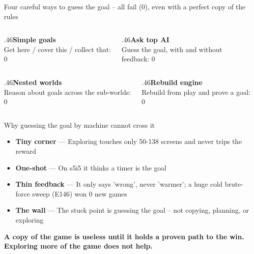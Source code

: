 \documentclass[aspectratio=169,11pt]{beamer}
\begin{document}
\begin{frame}{Four careful ways to guess the goal -- all fail (0), even with a perfect copy of the rules}\vfill\begin{columns}[T]\begin{column}{.46\textwidth}{\color{owdeep}\bfseries Simple goals}\\[2pt]{\color{owmuted}\small Get here / cover this / collect that: 0}\end{column}\begin{column}{.46\textwidth}{\color{owdeep}\bfseries Ask top AI}\\[2pt]{\color{owmuted}\small Guess the goal, with and without feedback: 0}\end{column}\end{columns}\vskip12pt\begin{columns}[T]\begin{column}{.46\textwidth}{\color{owdeep}\bfseries Nested worlds}\\[2pt]{\color{owmuted}\small Reason about goals across the sub-worlds: 0}\end{column}\begin{column}{.46\textwidth}{\color{owdeep}\bfseries Rebuild engine}\\[2pt]{\color{owmuted}\small Rebuild from play and prove a goal: 0}\end{column}\end{columns}\vfill\end{frame}
\begin{frame}{Why guessing the goal by machine cannot cross it}\vfill\begin{itemize}\item \textbf{Tiny corner} --- Exploring touches only 50-138 screens and never trips the reward\item \textbf{One-shot} --- On s5i5 it thinks a timer is the goal\item \textbf{Thin feedback} --- It only says 'wrong', never 'warmer'; a huge cold brute-force sweep (E146) won 0 new games\item \textbf{The wall} --- The stuck point is guessing the goal -- not copying, planning, or exploring\end{itemize}\vfill\end{frame}
\begin{frame}[plain]\centering\vfill
{\color{owdeep}\bfseries\LARGE A copy of the game is useless until it holds a proven path to the win. Exploring more of the game does not help.\par}\vfill\end{frame}
\end{document}
